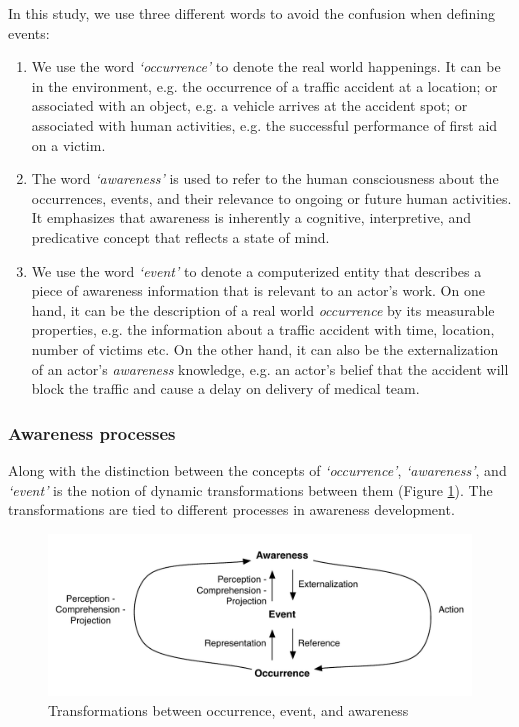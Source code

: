 In this study, we use three different words to avoid the confusion when defining events:
\begin{enumerate}
   \item We use the word \emph{`occurrence'} to denote the real world happenings. It can be in the environment, e.g. the occurrence of a traffic accident at a location; or associated with an object, e.g. a vehicle arrives at the accident spot; or associated with human activities, e.g. the successful performance of first aid on a victim. 
   \item The word \emph{`awareness'} is used to refer to the human consciousness about the occurrences, events, and their relevance to ongoing or future human activities. It emphasizes that awareness is inherently a cognitive, interpretive, and predicative concept that reflects a state of mind.
   \item We use the word \emph{`event'} to denote a computerized entity that describes a piece of awareness information that is relevant to an actor's work. On one hand, it can be the description of a real world \emph{occurrence} by its measurable properties, e.g. the information about a traffic accident with time, location, number of victims etc. On the other hand, it can also be the externalization of an actor's \emph{awareness} knowledge, e.g. an actor's belief that the accident will block the traffic and cause a delay on delivery of medical team.
\end{enumerate}

\subsubsection{Awareness processes} %
\label{ssub:awareness_processes}
Along with the distinction between the concepts of \emph{`occurrence'}, \emph{`awareness'}, and \emph{`event'} is the notion of dynamic transformations between them (Figure \ref{fig:occurrence_event_awareness}). The transformations are tied to different processes in awareness development. 

\begin{figure}[htbp] %
   \centering
   \includegraphics[width=4.5in]{occurrence_event_awareness.pdf} 
   \caption{Transformations between occurrence, event, and awareness}
   \label{fig:occurrence_event_awareness}
\end{figure}


